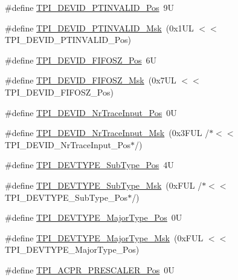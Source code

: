 \begin{DoxyCompactItemize}
\item 
\#define \mbox{\hyperlink{group___c_m_s_i_s___t_p_i_ga974cccf4c958b4a45cb71c7b5de39b7b}{T\+P\+I\+\_\+\+D\+E\+V\+I\+D\+\_\+\+P\+T\+I\+N\+V\+A\+L\+I\+D\+\_\+\+Pos}}~9U
\item 
\#define \mbox{\hyperlink{group___c_m_s_i_s___t_p_i_ga1ca84d62243e475836bba02516ba6b97}{T\+P\+I\+\_\+\+D\+E\+V\+I\+D\+\_\+\+P\+T\+I\+N\+V\+A\+L\+I\+D\+\_\+\+Msk}}~(0x1\+U\+L $<$$<$ T\+P\+I\+\_\+\+D\+E\+V\+I\+D\+\_\+\+P\+T\+I\+N\+V\+A\+L\+I\+D\+\_\+\+Pos)
\item 
\#define \mbox{\hyperlink{group___c_m_s_i_s___t_p_i_ga3c7bb073c7ef96c2c3491c523fcb5bbe}{T\+P\+I\+\_\+\+D\+E\+V\+I\+D\+\_\+\+F\+I\+F\+O\+S\+Z\+\_\+\+Pos}}~6U
\item 
\#define \mbox{\hyperlink{group___c_m_s_i_s___t_p_i_gac7e718d8f239920d5b65e3eaa1c490df}{T\+P\+I\+\_\+\+D\+E\+V\+I\+D\+\_\+\+F\+I\+F\+O\+S\+Z\+\_\+\+Msk}}~(0x7\+U\+L $<$$<$ T\+P\+I\+\_\+\+D\+E\+V\+I\+D\+\_\+\+F\+I\+F\+O\+S\+Z\+\_\+\+Pos)
\item 
\#define \mbox{\hyperlink{group___c_m_s_i_s___t_p_i_ga80ecae7fec479e80e583f545996868ed}{T\+P\+I\+\_\+\+D\+E\+V\+I\+D\+\_\+\+Nr\+Trace\+Input\+\_\+\+Pos}}~0U
\item 
\#define \mbox{\hyperlink{group___c_m_s_i_s___t_p_i_gabed454418d2140043cd65ec899abd97f}{T\+P\+I\+\_\+\+D\+E\+V\+I\+D\+\_\+\+Nr\+Trace\+Input\+\_\+\+Msk}}~(0x3\+F\+U\+L /$\ast$$<$$<$ T\+P\+I\+\_\+\+D\+E\+V\+I\+D\+\_\+\+Nr\+Trace\+Input\+\_\+\+Pos$\ast$/)
\item 
\#define \mbox{\hyperlink{group___c_m_s_i_s___t_p_i_ga0c799ff892af5eb3162d152abc00af7a}{T\+P\+I\+\_\+\+D\+E\+V\+T\+Y\+P\+E\+\_\+\+Sub\+Type\+\_\+\+Pos}}~4U
\item 
\#define \mbox{\hyperlink{group___c_m_s_i_s___t_p_i_ga5b2fd7dddaf5f64855d9c0696acd65c1}{T\+P\+I\+\_\+\+D\+E\+V\+T\+Y\+P\+E\+\_\+\+Sub\+Type\+\_\+\+Msk}}~(0x\+F\+U\+L /$\ast$$<$$<$ T\+P\+I\+\_\+\+D\+E\+V\+T\+Y\+P\+E\+\_\+\+Sub\+Type\+\_\+\+Pos$\ast$/)
\item 
\#define \mbox{\hyperlink{group___c_m_s_i_s___t_p_i_ga69c4892d332755a9f64c1680497cebdd}{T\+P\+I\+\_\+\+D\+E\+V\+T\+Y\+P\+E\+\_\+\+Major\+Type\+\_\+\+Pos}}~0U
\item 
\#define \mbox{\hyperlink{group___c_m_s_i_s___t_p_i_gaecbceed6d08ec586403b37ad47b38c88}{T\+P\+I\+\_\+\+D\+E\+V\+T\+Y\+P\+E\+\_\+\+Major\+Type\+\_\+\+Msk}}~(0x\+F\+U\+L $<$$<$ T\+P\+I\+\_\+\+D\+E\+V\+T\+Y\+P\+E\+\_\+\+Major\+Type\+\_\+\+Pos)
\item 
\#define \mbox{\hyperlink{group___c_m_s_i_s___t_p_i_ga5a82d274eb2df8b0c92dd4ed63535928}{T\+P\+I\+\_\+\+A\+C\+P\+R\+\_\+\+P\+R\+E\+S\+C\+A\+L\+E\+R\+\_\+\+Pos}}~0U
$$
\end{DoxyCompactItemize}
